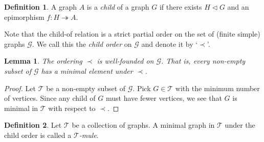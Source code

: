 \documentclass[12pt]{article}
\theoremstyle{plain}
\newtheorem{lem}[thm]{Lemma}
\theoremstyle{definition}
\newtheorem{defn}{Definition}
\theoremstyle{remark}
\newcommand{\fancy}[1]{\mathcal{#1}}
\newcommand{\surj}{\twoheadrightarrow}
\begin{document}
\begin{defn}
A graph $A$ is a \emph{child} of a graph $G$ if there exists $H \lhd G$ and an epimorphism $f\colon H \surj A$.  
\end{defn}

Note that the child-of relation is a strict partial order on the set of (finite simple) graphs $\fancy{G}$.  We call this the \emph{child order} on $\fancy{G}$ and denote it by `$\prec$'.

\begin{lem}\label{well-founded}
The ordering $\prec$ is well-founded on $\fancy{G}$.  That is, every non-empty subset of $\fancy{G}$ has a minimal element under $\prec$.
\end{lem}
\begin{proof}
Let $\fancy{T}$ be a non-empty subset of $\fancy{G}$.  Pick $G \in \fancy{T}$ with the minimum number of vertices.  Since any child of $G$ must have fewer vertices, we see that $G$ is minimal in $\fancy{T}$ with respect to $\prec$.
\end{proof}

\begin{defn}
Let $\fancy{T}$ be a collection of graphs.  A minimal graph in $\fancy{T}$ under the child order is called a \emph{$\fancy{T}$-mule}.
\end{defn}
\end{document}
